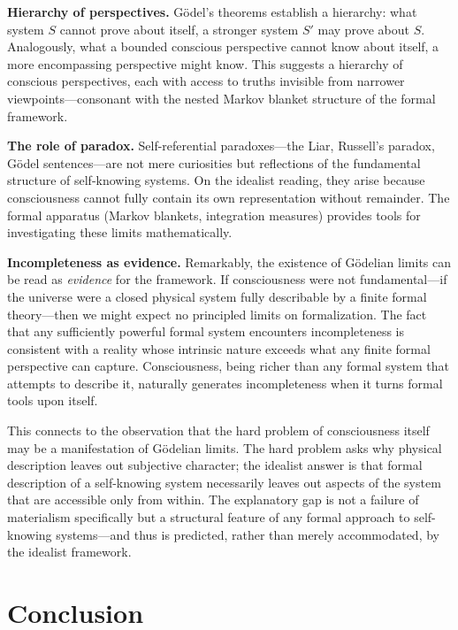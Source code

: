 \documentclass[11pt,a4paper]{article}
\theoremstyle{definition}
\theoremstyle{plain}
\theoremstyle{remark}
\begin{document}
\textbf{Hierarchy of perspectives.} G\"odel's theorems establish a hierarchy: what system $S$ cannot prove about itself, a stronger system $S'$ may prove about $S$. Analogously, what a bounded conscious perspective cannot know about itself, a more encompassing perspective might know. This suggests a hierarchy of conscious perspectives, each with access to truths invisible from narrower viewpoints---consonant with the nested Markov blanket structure of the formal framework.

\textbf{The role of paradox.} Self-referential paradoxes---the Liar, Russell's paradox, G\"odel sentences---are not mere curiosities but reflections of the fundamental structure of self-knowing systems. On the idealist reading, they arise because consciousness cannot fully contain its own representation without remainder. The formal apparatus (Markov blankets, integration measures) provides tools for investigating these limits mathematically.

\textbf{Incompleteness as evidence.} Remarkably, the existence of G\"odelian limits can be read as \textit{evidence} for the framework. If consciousness were not fundamental---if the universe were a closed physical system fully describable by a finite formal theory---then we might expect no principled limits on formalization. The fact that any sufficiently powerful formal system encounters incompleteness is consistent with a reality whose intrinsic nature exceeds what any finite formal perspective can capture. Consciousness, being richer than any formal system that attempts to describe it, naturally generates incompleteness when it turns formal tools upon itself.

This connects to the observation that the hard problem of consciousness itself may be a manifestation of G\"odelian limits. The hard problem asks why physical description leaves out subjective character; the idealist answer is that formal description of a self-knowing system necessarily leaves out aspects of the system that are accessible only from within. The explanatory gap is not a failure of materialism specifically but a structural feature of any formal approach to self-knowing systems---and thus is predicted, rather than merely accommodated, by the idealist framework.

\section{Conclusion}\label{sec:conclusion}
\end{document}
